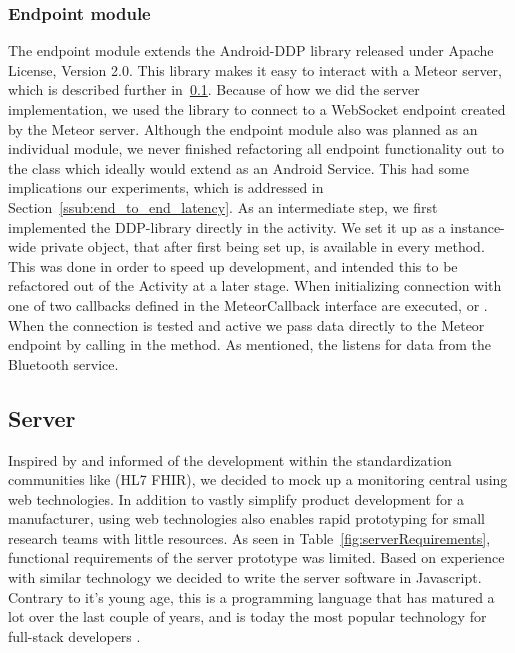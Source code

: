 
\subsubsection{Endpoint module} %
\label{ssub:endpoint_module}

The endpoint module extends the Android-DDP\cite{android:ddp} library released under Apache License, Version 2.0. This library makes it easy to interact with a Meteor server, which is described further in~\ref{sub:server}. Because of how we did the server implementation, we used the library to connect to a WebSocket endpoint created by the Meteor server.
Although the endpoint module also was planned as an individual module, we never finished refactoring all endpoint functionality out to the  class which ideally would extend as an Android Service. This had some implications our experiments, which is addressed in Section~\ref{ssub:end_to_end_latency}.
As an intermediate step, we first implemented the DDP-library directly in the \cite{NewDevice} activity. We set it up as a instance-wide private object, that after first being set up, is available in every method. This was done in order to speed up development, and intended this to be refactored out of the Activity at a later stage. When initializing connection with  one of two callbacks defined in the MeteorCallback interface are executed,  or  . When the connection is tested and active we pass data directly to the Meteor endpoint by calling  in the  method. As mentioned, the  listens for data from the Bluetooth service.



\subsection{Server} %
\label{sub:server}

Inspired by \cite{Thelen:2014ew} and informed of the development within the standardization communities like (HL7 FHIR), we decided to mock up a monitoring central using web technologies. In addition to vastly simplify product development for a manufacturer, using web technologies also enables rapid prototyping for small research teams with little resources. As seen in Table~\ref{fig:serverRequirements}, functional requirements of the server prototype was limited. Based on experience with similar technology we decided to write the server software in Javascript. Contrary to it's young age, this is a programming language that has matured a lot over the last couple of years, and is today the most popular technology for full-stack developers \cite{so:survey:results}.


